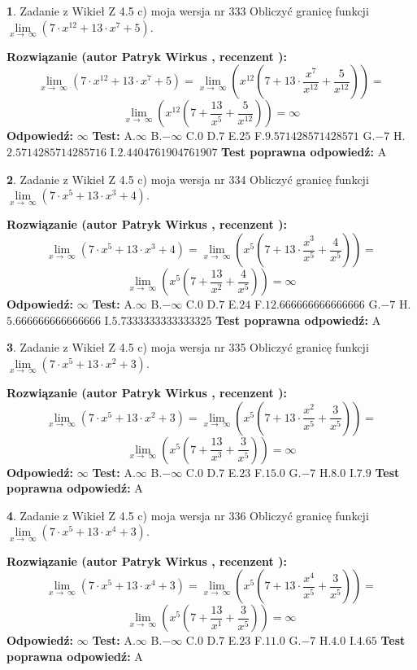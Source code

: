 \documentclass[12pt, a4paper]{article}
\theoremstyle{definition} %
\newtheorem{zad}{}
\newcommand{\zadStart}[1]{\begin{zad}#1\newline}
\newcommand{\zadStop}{\end{zad}}
\newcommand{\rozwStart}[2]{\noindent \textbf{Rozwiązanie (autor #1 , recenzent #2): }\newline}
\newcommand{\rozwStop}{\newline}
\newcommand{\odpStart}{\noindent \textbf{Odpowiedź:}\newline}
\newcommand{\odpStop}{\newline}
\newcommand{\testStart}{\noindent \textbf{Test:}\newline}
\newcommand{\testStop}{\newline}
\newcommand{\kluczStart}{\noindent \textbf{Test poprawna odpowiedź:}\newline}
\newcommand{\kluczStop}{\newline}
\begin{document}
\zadStart{Zadanie z Wikieł Z 4.5 c) moja wersja nr 333}
Obliczyć granicę funkcji  $\lim\limits_{x\to\ \infty}(7 \cdot x^{12}+13 \cdot x^{7}+5)$.
\zadStop
\rozwStart{Patryk Wirkus}{}
$$\lim\limits_{x\to\ \infty}(7 \cdot x^{12}+13 \cdot x^{7}+5) = \lim\limits_{x\to\ \infty}(x^{12}(7 +13 \cdot \frac{x^{7}}{x^{12}}+\frac{5}{x^{12}})) =$$ $$\lim\limits_{x\to\ \infty}(x^{12}(7 +\frac{13}{x^{5}}+\frac{5}{x^{12}})) =\infty$$
\rozwStop
\odpStart
$\infty$
\odpStop
\testStart
A.$\infty$ B.$-\infty$ C.$0$ D.$7$ E.$25$
F.$9.571428571428571$ G.$-7$
H.$2.5714285714285716$
I.$2.4404761904761907$
\testStop
\kluczStart
A
\kluczStop



\zadStart{Zadanie z Wikieł Z 4.5 c) moja wersja nr 334}
Obliczyć granicę funkcji  $\lim\limits_{x\to\ \infty}(7 \cdot x^{5}+13 \cdot x^{3}+4)$.
\zadStop
\rozwStart{Patryk Wirkus}{}
$$\lim\limits_{x\to\ \infty}(7 \cdot x^{5}+13 \cdot x^{3}+4) = \lim\limits_{x\to\ \infty}(x^{5}(7 +13 \cdot \frac{x^{3}}{x^{5}}+\frac{4}{x^{5}})) =$$ $$\lim\limits_{x\to\ \infty}(x^{5}(7 +\frac{13}{x^{2}}+\frac{4}{x^{5}})) =\infty$$
\rozwStop
\odpStart
$\infty$
\odpStop
\testStart
A.$\infty$ B.$-\infty$ C.$0$ D.$7$ E.$24$
F.$12.666666666666666$ G.$-7$
H.$5.666666666666666$
I.$5.7333333333333325$
\testStop
\kluczStart
A
\kluczStop



\zadStart{Zadanie z Wikieł Z 4.5 c) moja wersja nr 335}
Obliczyć granicę funkcji  $\lim\limits_{x\to\ \infty}(7 \cdot x^{5}+13 \cdot x^{2}+3)$.
\zadStop
\rozwStart{Patryk Wirkus}{}
$$\lim\limits_{x\to\ \infty}(7 \cdot x^{5}+13 \cdot x^{2}+3) = \lim\limits_{x\to\ \infty}(x^{5}(7 +13 \cdot \frac{x^{2}}{x^{5}}+\frac{3}{x^{5}})) =$$ $$\lim\limits_{x\to\ \infty}(x^{5}(7 +\frac{13}{x^{3}}+\frac{3}{x^{5}})) =\infty$$
\rozwStop
\odpStart
$\infty$
\odpStop
\testStart
A.$\infty$ B.$-\infty$ C.$0$ D.$7$ E.$23$
F.$15.0$ G.$-7$
H.$8.0$
I.$7.9$
\testStop
\kluczStart
A
\kluczStop



\zadStart{Zadanie z Wikieł Z 4.5 c) moja wersja nr 336}
Obliczyć granicę funkcji  $\lim\limits_{x\to\ \infty}(7 \cdot x^{5}+13 \cdot x^{4}+3)$.
\zadStop
\rozwStart{Patryk Wirkus}{}
$$\lim\limits_{x\to\ \infty}(7 \cdot x^{5}+13 \cdot x^{4}+3) = \lim\limits_{x\to\ \infty}(x^{5}(7 +13 \cdot \frac{x^{4}}{x^{5}}+\frac{3}{x^{5}})) =$$ $$\lim\limits_{x\to\ \infty}(x^{5}(7 +\frac{13}{x^{1}}+\frac{3}{x^{5}})) =\infty$$
\rozwStop
\odpStart
$\infty$
\odpStop
\testStart
A.$\infty$ B.$-\infty$ C.$0$ D.$7$ E.$23$
F.$11.0$ G.$-7$
H.$4.0$
I.$4.65$
\testStop
\kluczStart
A
\kluczStop
\end{document}
